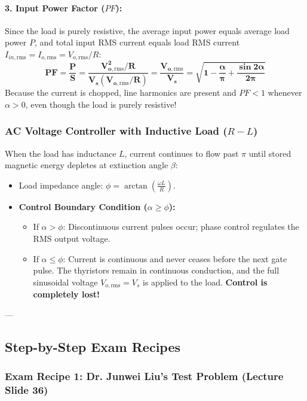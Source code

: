 \paragraph{3. Input Power Factor ($PF$):}
Since the load is purely resistive, the average input power equals average load power $P$, and total input RMS current equals load RMS current $I_{in,\mathrm{rms}} = I_{o,\mathrm{rms}} = V_{o,\mathrm{rms}} / R$:
\begin{equation}
\label{eq:ac_ac_pf}
\mathbf{PF = \frac{P}{S} = \frac{V_{o,\mathrm{rms}}^2 / R}{V_s (V_{o,\mathrm{rms}} / R)} = \frac{V_{o,\mathrm{rms}}}{V_s} = \sqrt{1 - \frac{\alpha}{\pi} + \frac{\sin 2\alpha}{2\pi}}}
\end{equation}
Because the current is chopped, line harmonics are present and $PF < 1$ whenever $\alpha > 0$, even though the load is purely resistive!

\subsubsection{AC Voltage Controller with Inductive Load ($R-L$)}
When the load has inductance $L$, current continues to flow past $\pi$ until stored magnetic energy depletes at extinction angle $\beta$:
\begin{itemize}
  \item Load impedance angle: $\phi = \arctan\left(\frac{\omega L}{R}\right)$.
  \item \textbf{Control Boundary Condition ($\alpha \ge \phi$):}
  \begin{itemize}
    \item If $\alpha > \phi$: Discontinuous current pulses occur; phase control regulates the RMS output voltage.
    \item If $\alpha \le \phi$: Current is continuous and never ceases before the next gate pulse. The thyristors remain in continuous conduction, and the full sinusoidal voltage $V_{o,\mathrm{rms}} = V_s$ is applied to the load. \textbf{Control is completely lost!}
  \end{itemize}
\end{itemize}

---

\subsection{Step-by-Step Exam Recipes}

\subsubsection{Exam Recipe 1: Dr. Junwei Liu's Test Problem (Lecture Slide 36)}
